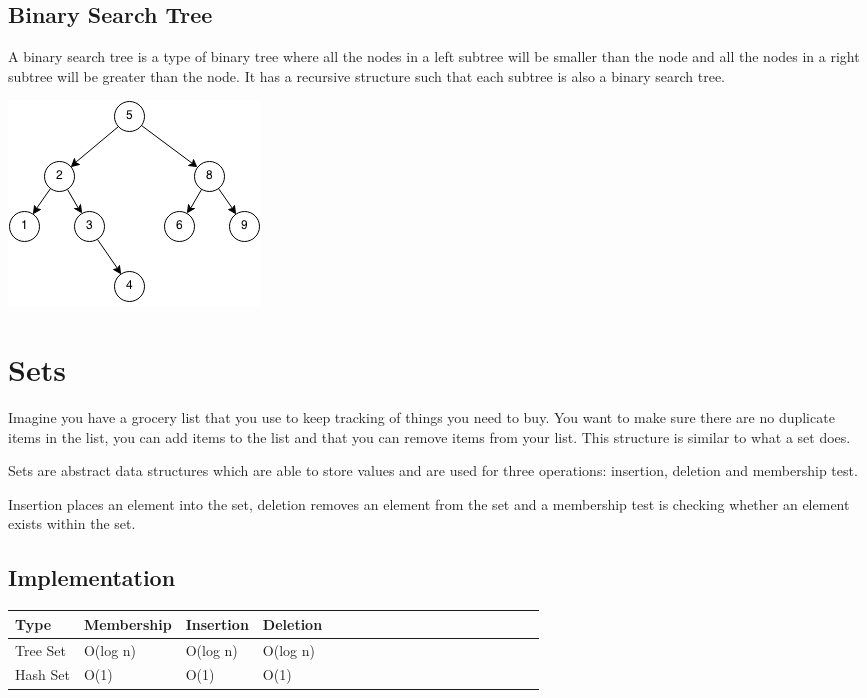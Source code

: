 \documentclass[11pt,oneside]{book}
\makeatletter
\def\maxwidth#1{\ifdim\Gin@nat@width>#1 #1\else\Gin@nat@width\fi}
\makeatother
\begin{document}
\subsection{Binary Search Tree}

A binary search tree is a type of binary tree where all the nodes in a left subtree will be smaller than the node and all the nodes in a right subtree will be greater than the node. It has a recursive structure such that each subtree is also a binary search tree.

\includegraphics[width=\maxwidth{\textwidth}]{bst.png}
\section{Sets}

Imagine you have a grocery list that you use to keep tracking of things you need to buy. You want to make sure there are no duplicate items in the list, you can add items to the list and that you can remove items from your list. This structure is similar to what a set does.

Sets are abstract data structures which are able to store values and are used for three operations: insertion, deletion and membership test.

Insertion places an element into the set, deletion removes an element from the set and a membership test is checking whether an element exists within the set.

\subsection{Implementation}

\vspace{10pt} \begin{tabular}{|l|l|l|l|l|l|l|l|l|l|l|l|l|l|l|l|l|l|l}\hline


  Type &
  Membership &
  Insertion &
  Deletion\\
\hline


  Tree Set &
  O(log n) &
  O(log n) &
  O(log n)\\

  Hash Set &
  O(1) &
  O(1) &
  O(1)\\

\hline\end{tabular}
\end{document}

